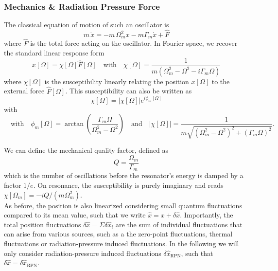 \subsubsection{Mechanics \& Radiation Pressure Force }
The classical equation of motion of such an oscillator is
\begin{equation}
  m \, \ddot{ x} = -m \, \Omega_m^2 x - m \Gamma_m \dot{x} + \hat F
\end{equation}
where $\hat F$ is the total force acting on the oscillator.
In Fourier space, we recover the standard linear response form
\begin{equation}
  x [\Omega] = \chi[\Omega] \hat F[\Omega] \quad \text{with} \quad \chi[\Omega] = \frac{1}{m(\Omega_m^2 - \Omega^2 - i \Gamma_m \Omega)}
\end{equation}
where $\chi[\Omega]$ is the susceptibility linearly relating the position $ x [\Omega]$ to the external force $\hat F[\Omega]$. This susceptibility can also be written as 
\begin{equation}
  \chi[\Omega] = |\chi[\Omega]| e^{i \phi_m[\Omega]}
\end{equation}
with 
\begin{equation*}  
  \quad \text{with} \quad \phi_m[\Omega] = \arctan\left(\frac{\Gamma_m \Omega}{\Omega_m^2 - \Omega^2}\right) \quad \text{and} \quad |\chi[\Omega]| = \frac{1}{m\sqrt{(\Omega_m^2 - \Omega^2)^2 + (\Gamma_m \Omega)^2}}.
\end{equation*}

We can define the mechanical quality factor, defined as 
\begin{equation}
  Q = \frac{\Omega_m}{\Gamma_m}
\end{equation}
which is the number of oscillations before the resonator's energy is damped by a factor $1/e$. On resonance, the susceptibility is purely imaginary and reads $\chi[\Omega_m] = -i Q/(m \Omega_m^2)$. \\ 

As before, the position is also linearized considering small quantum fluctuations compared to its mean value, such that we write $\hat{x}= x + \delta \hat{x}$. Importantly, the total position fluctuations $\delta \hat{x} = \Sigma \delta \hat{x}_i$ are the sum of individual fluctuations that can arise from various sources, such as a the zero-point fluctuations, thermal fluctuations or radiation-pressure induced fluctuations. In the following we will only consider radiation-pressure induced fluctuations $\delta \hat{x}_{\mathrm{RPN}}$, such that $\delta \hat{x} =  \delta \hat{x}_{\mathrm{RPN}}$. \\ 

